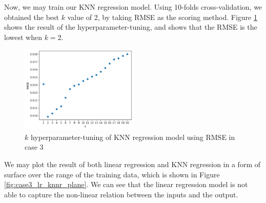 \documentclass[conf]{new-aiaa}
\begin{document}
Now, we may train our KNN regression model. Using 10-folds cross-validation, we obtained the best $k$ value of 2, by taking RMSE as the scoring method. Figure \ref{fig:case3_knnr_rmse} shows the result of the hyperparameter-tuning, and shows that the RMSE is the lowest when $k=2$. 
\begin{figure}
    \centering
    \includegraphics[width=0.5\textwidth]{graph/case3_knnr_rmse.png}
    \caption{$k$ hyperparameter-tuning of KNN regression model using RMSE in case 3}
    \label{fig:case3_knnr_rmse}
\end{figure}
We may plot the result of both linear regression and KNN regression in a form of surface over the range of the training data, which is shown in Figure \ref{fig:case3_lr_knnr_plane}. We can see that the linear regression model is not able to capture the non-linear relation between the inputs and the output.
\end{document}

